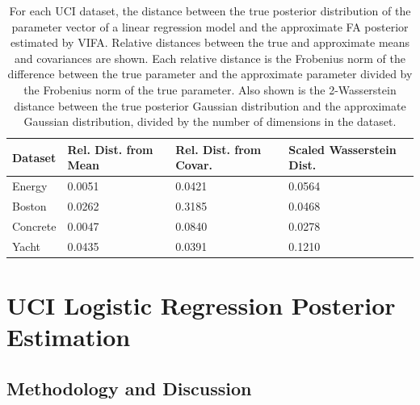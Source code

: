 \documentclass[10pt]{article} %
\begin{document}
\begin{table}[!h]
\caption{For each UCI dataset, the distance between the true posterior distribution
of the parameter vector of a linear regression model and the approximate FA posterior
estimated by VIFA. Relative distances between the true and approximate means and
covariances are shown. Each relative distance is the Frobenius norm of the difference
between the true parameter and the approximate parameter divided by the Frobenius
norm of the true parameter. Also shown is the 2-Wasserstein distance between the true
posterior Gaussian distribution and the approximate Gaussian distribution, divided by
the number of dimensions in the dataset.}
\label{table:linear_regression_vi_posterior_uci}
\begin{center}
\begin{tabular}{l|lll}
\textbf{Dataset} & \textbf{Rel. Dist. from Mean} & \textbf{Rel. Dist. from Covar.} & \textbf{Scaled Wasserstein Dist.} \\ \hline
Energy           & 0.0051                        & 0.0421                          & 0.0564                            \\
Boston           & 0.0262                        & 0.3185                          & 0.0468                            \\
Concrete         & 0.0047                        & 0.0840                          & 0.0278                            \\
Yacht            & 0.0435                        & 0.0391                          & 0.1210                           
\end{tabular}
\end{center}
\end{table}

\section{UCI Logistic Regression Posterior Estimation}
\label{app:UCI_logistic_regression_posterior_estimation}

\subsection{Methodology and Discussion}
\end{document}
